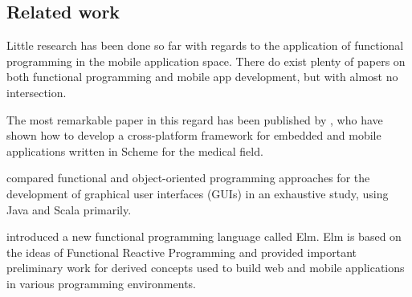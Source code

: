 \subsection{Related work}

Little research has been done so far with regards to the application of functional programming in the mobile application space. There do exist plenty of papers on both functional programming and mobile app development, but with almost no intersection.

The most remarkable paper in this regard has been published by \cite{petersen_experience_2013}, who have shown how to develop a cross-platform framework for embedded and mobile applications written in Scheme for the medical field. 

\cite{kiss_comparison_2014} compared functional and object-oriented programming approaches for the development of graphical user interfaces (GUIs) in an exhaustive study, using Java and Scala primarily. 

\cite{czaplicki_elm:_2012} introduced a new functional programming language called Elm. Elm is based on the ideas of Functional Reactive Programming and provided important preliminary work for derived concepts used to build web and mobile applications in various programming environments.
